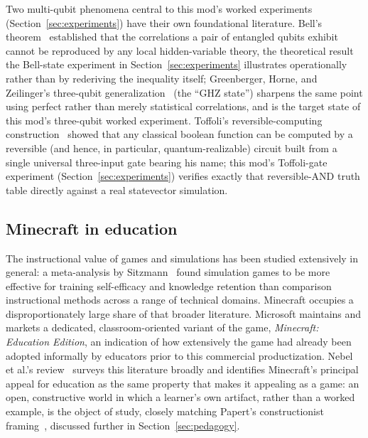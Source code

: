 Two multi-qubit phenomena central to this mod's worked experiments
(Section~\ref{sec:experiments}) have their own foundational literature. Bell's
theorem~\cite{bell1964epr} established that the correlations a pair of entangled qubits
exhibit cannot be reproduced by any local hidden-variable theory, the theoretical result the
Bell-state experiment in Section~\ref{sec:experiments} illustrates operationally rather than
by rederiving the inequality itself; Greenberger, Horne, and Zeilinger's three-qubit
generalization~\cite{ghz1989going} (the ``GHZ state'') sharpens the same point using perfect
rather than merely statistical correlations, and is the target state of this mod's
three-qubit worked experiment. Toffoli's reversible-computing
construction~\cite{toffoli1980reversible} showed that any classical boolean function can be
computed by a reversible (and hence, in particular, quantum-realizable) circuit built from a
single universal three-input gate bearing his name; this mod's Toffoli-gate experiment
(Section~\ref{sec:experiments}) verifies exactly that reversible-AND truth table directly
against a real statevector simulation.

\subsection{Minecraft in education}
\label{sec:minecraft-in-education}

The instructional value of games and simulations has been studied extensively in general: a
meta-analysis by Sitzmann~\cite{sitzmann2011meta} found simulation games to be more effective
for training self-efficacy and knowledge retention than comparison instructional methods
across a range of technical domains. Minecraft occupies a disproportionately large share of
that broader literature. Microsoft maintains and markets a dedicated, classroom-oriented
variant of the game, \emph{Minecraft: Education Edition}, an indication of how extensively the
game had already been adopted informally by educators prior to this commercial
productization. Nebel et al.'s review~\cite{nebel2016mining} surveys this literature broadly
and identifies Minecraft's principal appeal for education as the same property that makes it
appealing as a game: an open, constructive world in which a learner's own artifact, rather
than a worked example, is the object of study, closely matching Papert's constructionist
framing~\cite{papert1980mindstorms}, discussed further in Section~\ref{sec:pedagogy}.

